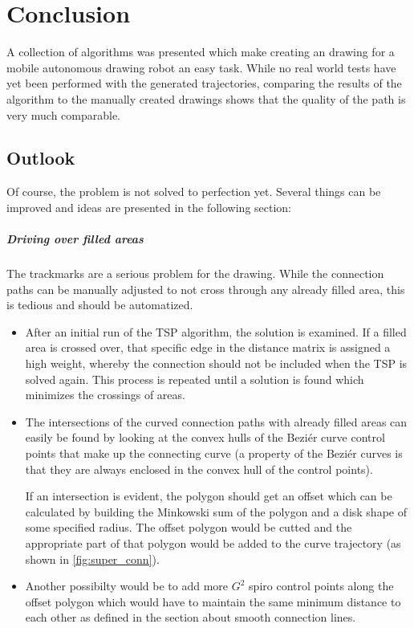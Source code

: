 \chapter{Conclusion}

A collection of algorithms was presented which make creating an drawing for a mobile autonomous drawing robot an easy task. While no real world tests have yet been performed with the generated trajectories, comparing the results of the algorithm to the manually created drawings shows that the quality of the path is very much comparable. 


\section{Outlook}
Of course, the problem is not solved to perfection yet. Several things can be improved and ideas are presented in the following section:

\paragraph{Driving over filled areas} The trackmarks are a serious problem for the drawing. While the connection paths can be manually adjusted to not cross through any already filled area, this is tedious and should be automatized.
\begin{itemize}
\item After an initial run of the TSP algorithm, the solution is examined. If a filled area is crossed over, that specific edge in the distance matrix is assigned a high weight, whereby the connection should not be included when the TSP is solved again. This process is repeated until a solution is found which minimizes the crossings of areas.
\item The intersections of the curved connection paths with already filled areas can easily be found by looking at the convex hulls of the Beziér curve control points that make up the connecting curve (a property of the Beziér curves is that they are always enclosed in the convex hull of the control points). 

If an intersection is evident, the polygon should get an offset which can be calculated by building the Minkowski sum of the polygon and a disk shape of some specified radius.  The offset polygon would be cutted and the appropriate part of that polygon would be added to the curve trajectory (as shown in \autoref{fig:super_conn}).
\item Another possibilty would be to add more $G^2$ spiro control points along the offset polygon which would have to maintain the same minimum distance to each other as defined in the section about smooth connection lines.
\end{itemize}

